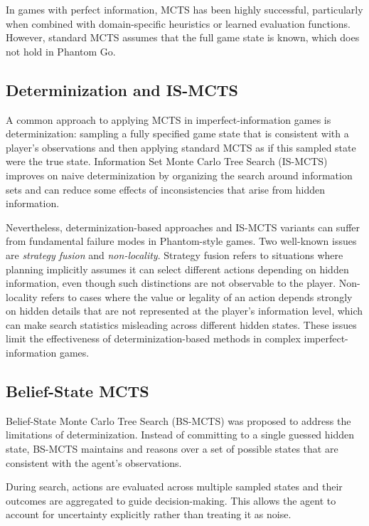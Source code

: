 \documentclass[12pt,oneside,openright]{article}
\begin{document}
In games with perfect information, MCTS has been highly successful, particularly when combined with domain-specific heuristics or learned evaluation functions\cite{Browne2012mcts}.
However, standard MCTS assumes that the full game state is known, which does not hold in Phantom Go.


\subsection{Determinization and IS-MCTS}
\label{sec:determinization}

A common approach to applying MCTS in imperfect-information games is determinization: sampling a fully specified game state that is consistent with a player's observations and then applying standard MCTS as if this sampled state were the true state. Information Set Monte Carlo Tree Search (IS-MCTS) improves on naive determinization by organizing the search around information sets and can reduce some effects of inconsistencies that arise from hidden information.

Nevertheless, determinization-based approaches and IS-MCTS variants can suffer from fundamental failure modes in Phantom-style games. Two well-known issues are \emph{strategy fusion} and \emph{non-locality}\cite{Cowling2012ismcts}. Strategy fusion refers to situations where planning implicitly assumes it can select different actions depending on hidden information, even though such distinctions are not observable to the player. Non-locality refers to cases where the value or legality of an action depends strongly on hidden details that are not represented at the player's information level, which can make search statistics misleading across different hidden states.
These issues limit the effectiveness of determinization-based methods in complex imperfect-information games.


\subsection{Belief-State MCTS}

Belief-State Monte Carlo Tree Search (BS-MCTS) was proposed to address the limitations of determinization. Instead of committing to a single guessed hidden state, BS-MCTS maintains and reasons over a set of possible states that are consistent with the agent's observations.

During search, actions are evaluated across multiple sampled states and their outcomes are aggregated to guide decision-making. This allows the agent to account for uncertainty explicitly rather than treating it as noise.
\end{document}
